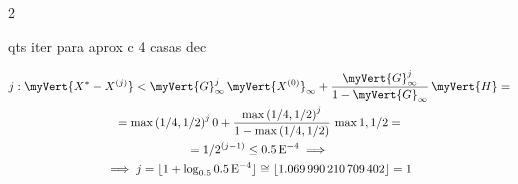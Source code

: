 \documentclass[./CN_A-Tests_Resolutions.tex]{subfiles}
\begin{document}
\begin{questionBox}2{} %

  qts iter para aprox c 4 casas dec

  \answer{}

  \begin{gather*}
    j:
    \myVert{X^{*}-X^{(j)}}<
    \myVert{G}_{\infty}^j
    \,\myVert{X^{(0)}}_{\infty}
    +\frac
    {\myVert{G}_{\infty}^j}
    {1-\myVert{G}_{\infty}}
    \,\myVert{H}
    = \\
    = \max{(1/4,1/2)}^j
    \,0
    +\frac
    {\max{(1/4,1/2)}^j}
    {1-\max{(1/4,1/2)}}
    \,\max{1,1/2}
    = \\
    = 1/2^{(j-1)}
    \leq0.5\E{-4}
    \implies \\
    \implies
    j
    =
    \floor{1+\log_{0.5}{0.5\E{-4}}}
    \cong\floor{\num{1.069990210709402}}
    =1
  \end{gather*}

\end{questionBox}
\end{document}
